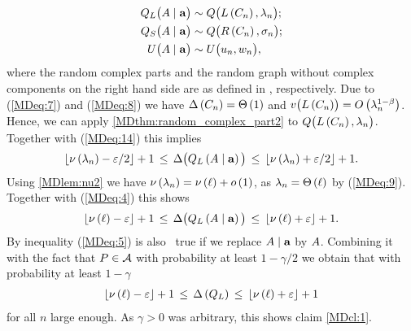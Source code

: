 \begin{align}
Q_L\big(A \mid \mathbf{a}\big) &\sim Q\big(L\left(C_n\right), \lambda_n\big);\label{MDeq:14}\\
Q_S\big(A \mid \mathbf{a}\big) &\sim Q\big(R\left(C_n\right), \sigma_n\big);\label{MDeq:15}\\
U\big(A \mid \mathbf{a}\big)&\sim U\big(u_n,w_n\big),\label{MDeq:16}
\end{align}
where the random complex parts and the random graph without complex components on the right hand side are as defined in , respectively.
Due to (\ref{MDeq:7}) and (\ref{MDeq:8}) we have $\Delta\left(C_n\right)=\Theta\left(1\right)$ and $v\big({L\left(C_n\right)}\big)=O\left(\lambda_n^{1-\beta}\right)$. Hence, we can apply \ref{MDthm:random_complex_part2} to $Q\big(L\left(C_n\right), \lambda_n\big)$. Together with (\ref{MDeq:14}) this implies \whp
\begin{align}\label{MDeq:4}
	\left\lfloor\nu\left(\lambda_n\right)-\varepsilon/2\right\rfloor+1\hspace{0.06cm}\leq\hspace{0.06cm} \Delta\big(Q_L\left(A \mid \mathbf{a}\right)\big)\hspace{0.06cm}\leq\hspace{0.06cm} 	\left\lfloor\nu\left(\lambda_n\right)+\varepsilon/2\right\rfloor+1.
\end{align}
Using \ref{MDlem:nu2} we have $\nu\left(\lambda_n\right)=\nu\left(\ell\right)+o\left(1\right)$, as $\lambda_n=\Theta\left(\ell\right)$ by (\ref{MDeq:9}). Together with (\ref{MDeq:4}) this shows \whp
\begin{align}\label{MDeq:5}
	\left\lfloor\nu\left(\ell\right)-\varepsilon\right\rfloor+1\hspace{0.06cm}\leq\hspace{0.06cm} \Delta\big(Q_L\left(A \mid \mathbf{a}\right)\big)\hspace{0.06cm}\leq\hspace{0.06cm} 	\left\lfloor\nu\left(\ell\right)+\varepsilon\right\rfloor+1.
\end{align}
By  inequality (\ref{MDeq:5}) is also \whp\ true if we replace $A \mid \mathbf{a}$ by $A$. Combining it with the fact that $P \in \mathcal{A}$ with probability at least $1-\gamma/2$ we obtain that with probability at least $1-\gamma$
\begin{align*}
	\left\lfloor\nu\left(\ell\right)-\varepsilon\right\rfloor+1\hspace{0.06cm}\leq\hspace{0.06cm} \Delta\left(Q_L\right)\hspace{0.06cm}\leq\hspace{0.06cm} 	\left\lfloor\nu\left(\ell\right)+\varepsilon\right\rfloor+1
\end{align*}
for all $n$ large enough. As $\gamma>0$ was arbitrary, this shows claim \ref{MDcl:1}. 


